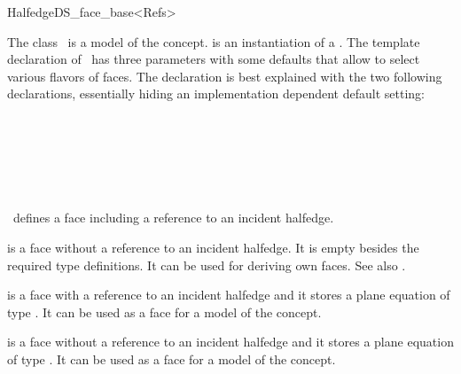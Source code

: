 
\ccRefPageBegin



\begin{ccRefClass}{HalfedgeDS_face_base<Refs>}
  
\ccDefinition
  
The class \ccRefName\ is a model of the 
concept.  is an instantiation of a .  The
template declaration of \ccRefName\ has three parameters with some
defaults that allow to select various flavors of faces. The
declaration is best explained with the two following declarations,
essentially hiding an implementation dependent default setting:

~~~~~~\\
\mbox{}~~~~~~

~~~~~~\\
\mbox{}~~~~~~

\ccRefName\ defines a face including a reference to an incident halfedge.

 is a face
without a reference to an incident halfedge. It is empty besides the
required type definitions. It can be used for deriving own faces.
See also .

 is a face with
a reference to an incident halfedge and it stores a plane equation of
type .  It can be used as a face for a model of the
 concept.

 is a face
without a reference to an incident halfedge and it stores a plane
equation of type .  It can be used as a face for a
model of the  concept.


\end{ccRefClass}
